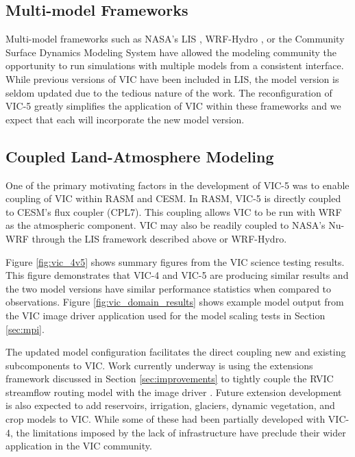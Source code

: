 \documentclass[gmd, manuscript]{copernicus}
\begin{document}
  \subsection{Multi-model Frameworks}
    \label{sec:multimodel}
    Multi-model frameworks such as NASA's LIS \citep{Kumar_2006}, WRF-Hydro \citep{Gochis_2013}, or the Community Surface Dynamics Modeling System \citep{Peckham_2016} have allowed the modeling community the opportunity to run simulations with multiple models from a consistent interface.
    While previous versions of VIC have been included in LIS, the model version is seldom updated due to the tedious nature of the work.
    The reconfiguration of VIC-5 greatly simplifies the application of VIC within these frameworks and we expect that each will incorporate the new model version.

  \subsection{Coupled Land-Atmosphere Modeling}
    \label{sec:coupled_apps}
    One of the primary motivating factors in the development of VIC-5 was to enable coupling of VIC within RASM and CESM.
    In RASM, VIC-5 is directly coupled to CESM's flux coupler (CPL7).
    This coupling allows VIC to be run with WRF as the atmospheric component.
    VIC may also be readily coupled to NASA's Nu-WRF through the LIS framework described above or WRF-Hydro.


  Figure \ref{fig:vic_4v5} shows summary figures from the VIC science testing results.
  This figure demonstrates that VIC-4 and VIC-5 are producing similar results and the two model versions have similar performance statistics when compared to observations.
  Figure \ref{fig:vic_domain_results} shows example model output from the VIC image driver application used for the model scaling tests in Section \ref{sec:mpi}.

  The updated model configuration facilitates the direct coupling new and existing subcomponents to VIC.
  Work currently underway is using the extensions framework discussed in Section \ref{sec:improvements} to tightly couple the RVIC streamflow routing model with the image driver \citep{Hamman_2017a}.
  Future extension development is also expected to add reservoirs, irrigation, glaciers, dynamic vegetation, and crop models to VIC.
  While some of these had been partially developed with VIC-4, the limitations imposed by the lack of infrastructure have preclude their wider application in the VIC community.
\end{document}
